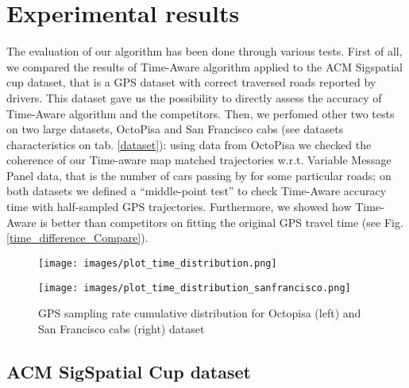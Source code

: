 \documentclass[5p]{elsarticle}
\begin{document}
\section{Experimental results}

The evaluation of our algorithm has been done through various tests. First of all, we compared the results of Time-Aware algorithm applied to the ACM Sigspatial cup dataset, that is
a GPS dataset with correct traversed roads reported by drivers. This dataset gave us the possibility to directly assess the accuracy of Time-Aware algorithm and the competitors. Then, 
we perfomed other two tests on two large datasets, OctoPisa and San Francisco cabs (see datasets characteristics on tab. \ref{dataset}): using data from OctoPisa we checked the coherence of our
Time-aware map matched trajectories w.r.t. Variable Message Panel data, that is the number of cars passing by for some particular roads; on both datasets we 
defined a ``middle-point test'' to check Time-Aware accuracy time with half-sampled GPS trajectories. Furthermore, we showed how Time-Aware is better than competitors on fitting
the original GPS travel time (see Fig. \ref{time_difference_Compare}). 


\begin{figure*}[h!]
\begin{minipage}[b]{0.45\linewidth}
\texttt{[image: images/plot\_time\_distribution.png]}
\label{octopisa-cumulative}

\end{minipage}
\quad
\begin{minipage}[b]{0.45\linewidth}
\texttt{[image: images/plot\_time\_distribution\_sanfrancisco.png]}
 \label{sanfrancisco-cumulative}

\end{minipage}


\caption{GPS sampling rate cumulative distribution for Octopisa (left) and San Francisco cabs (right) dataset}
\label{sampling_Distribution}
\end{figure*}
\subsection{ACM SigSpatial Cup dataset}
\end{document}
